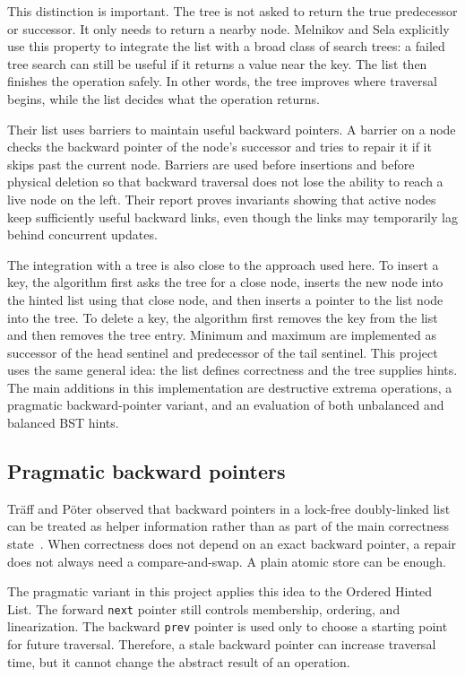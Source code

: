 \documentclass[a4paper,11pt]{article}
\newcommand{\code}[1]{\texttt{#1}}
\begin{document}
This distinction is important. The tree is not asked to return the true predecessor or successor. It only needs to return a nearby node. Melnikov and Sela explicitly use this property to integrate the list with a broad class of search trees: a failed tree search can still be useful if it returns a value near the key. The list then finishes the operation safely. In other words, the tree improves where traversal begins, while the list decides what the operation returns.

Their list uses barriers to maintain useful backward pointers. A barrier on a node checks the backward pointer of the node's successor and tries to repair it if it skips past the current node. Barriers are used before insertions and before physical deletion so that backward traversal does not lose the ability to reach a live node on the left. Their report proves invariants showing that active nodes keep sufficiently useful backward links, even though the links may temporarily lag behind concurrent updates.

The integration with a tree is also close to the approach used here. To insert a key, the algorithm first asks the tree for a close node, inserts the new node into the hinted list using that close node, and then inserts a pointer to the list node into the tree. To delete a key, the algorithm first removes the key from the list and then removes the tree entry. Minimum and maximum are implemented as successor of the head sentinel and predecessor of the tail sentinel. This project uses the same general idea: the list defines correctness and the tree supplies hints. The main additions in this implementation are destructive extrema operations, a pragmatic backward-pointer variant, and an evaluation of both unbalanced and balanced BST hints.

\subsection{Pragmatic backward pointers}

Tr\"{a}ff and P\"{o}ter observed that backward pointers in a lock-free doubly-linked list can be treated as helper information rather than as part of the main correctness state~\cite{traff2020pragmatic}. When correctness does not depend on an exact backward pointer, a repair does not always need a compare-and-swap. A plain atomic store can be enough.

The pragmatic variant in this project applies this idea to the Ordered Hinted List. The forward \code{next} pointer still controls membership, ordering, and linearization. The backward \code{prev} pointer is used only to choose a starting point for future traversal. Therefore, a stale backward pointer can increase traversal time, but it cannot change the abstract result of an operation.
\end{document}
